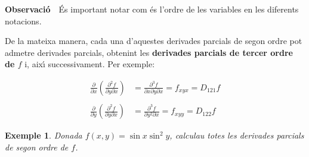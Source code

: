 \documentclass[12pt]{article}
\newcommand{\observacio}{\textbf{Observaci{\'o}}\ \ }
\newtheorem{exemple}{Exemple}[subsection]
\newcommand{\R}{\mathbb{R}}
\begin{document}
\observacio {\'E}s important notar com {\'e}s l'ordre de les variables en les diferents notacions.

De la mateixa manera, cada una d'aquestes derivades parcials de
segon ordre pot admetre derivades parcials,
obtenint les \textbf{derivades parcials de tercer ordre de
$f$ } i, aix{\'\i} successivament. Per exemple:

\vspace{0.4cm}
\begin{equation*}
\begin{split}
\frac{\partial}{\partial x} \left( \frac{\partial^{2} f}{\partial
y \partial x} \right) & =\frac{\partial^{3} f}{\partial x \partial
y
\partial
x} = f_{xyx}=D_{121} f \\
&\\
 \frac{\partial}{\partial y}
\left( \frac{\partial^{2} f}{\partial y \partial x} \right) &
=\frac{\partial^{3} f}{\partial y^{2}
\partial x} =
f_{xyy}=D_{122} f
\end{split}
\end{equation*}


%
%

\vspace{0.4cm}
\begin{exemple}
Donada $f(x,y)=\sin x  \sin^{2} y$, calculau totes les derivades
parcials de segon ordre de $f$.
 \end{exemple}
\end{document}
